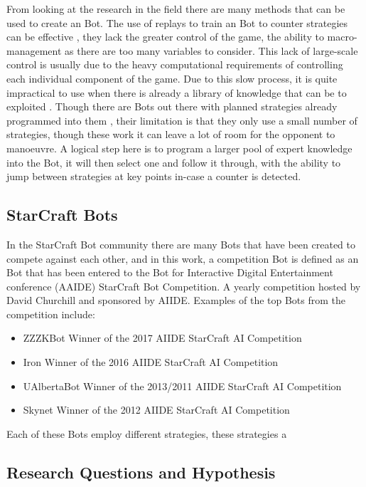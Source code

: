 \documentclass[journal]{IEEEtran}
\begin{document}
From looking at the research in the field there are many methods that can be used to create an Bot. The use of replays to train an Bot to counter strategies can be effective \cite{Bayesian}, they lack the greater control of the game, the ability to macro-management as there are too many variables to consider. This lack of large-scale control is usually due to the heavy computational requirements of controlling each individual component of the game.  Due to this slow process, it is quite impractical to use when there is already a library of knowledge that can be to exploited \cite{Liquid}. Though there are Bots out there with planned strategies already programmed into them \cite{ZZZK,Fuzzy}, their limitation is that they only use a small number of strategies, though these work it can leave a lot of room for the opponent to manoeuvre. A logical step here is to program a larger pool of expert knowledge into the Bot, it will then select one and follow it through, with the ability to jump between strategies at key points in-case a counter is detected. 

\subsection{StarCraft Bots}
In the StarCraft Bot community there are many Bots that have been created to compete against each other, and in this work, a competition Bot is defined as an Bot that has been entered to the Bot for Interactive Digital Entertainment conference (AAIDE) StarCraft Bot Competition. A yearly competition hosted by David Churchill and sponsored by AIIDE. Examples of the top Bots from the competition include:
\begin{itemize}
\item ZZZKBot Winner of the 2017 AIIDE StarCraft AI Competition \cite{ZZZK} 
\item Iron Winner of the 2016 AIIDE StarCraft AI Competition \cite{Iron}
\item UAlbertaBot Winner of the 2013/2011 AIIDE StarCraft AI Competition \cite{UAlberta}
\item Skynet Winner of the 2012 AIIDE StarCraft AI Competition \cite{Skynet}
\end{itemize}

Each of these Bots employ different strategies, these strategies a

\subsection{Research Questions and Hypothesis}
\end{document}
